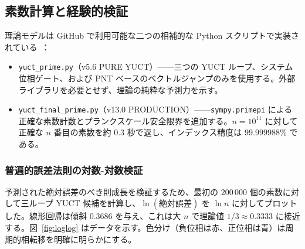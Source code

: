 \documentclass[12pt,a4paper]{article}
\theoremstyle{remark}
\begin{document}
	\subsection{素数計算と経験的検証}
	\label{sec:prime-empirical}
	
	理論モデルは GitHub で利用可能な二つの相補的な Python スクリプトで実装されている~\cite{PrimeRepo}：
	\begin{itemize}
		\item \texttt{yuct\_prime.py}（v5.6 PURE YUCT）——三つの YUCT ループ、システム位相ゲート、および PNT ベースのベクトルジャンプのみを使用する。外部ライブラリを必要とせず、理論の純粋な予測力を示す。
		\item \texttt{yuct\_final\_prime.py}（v13.0 PRODUCTION）——\texttt{sympy.primepi} による正確な素数計数とプランクスケール安全限界を追加する。\(n=10^{11}\) に対して正確な \(n\) 番目の素数を約 \(0.3\) 秒で返し、インデックス精度は \(99.999988\%\) である。
	\end{itemize}
	
	\subsubsection{普遍的誤差法則の対数-対数検証}
	
	予測された絶対誤差のべき則成長を検証するため、最初の \(200\,000\) 個の素数に対して三ループ YUCT 候補を計算し、\(\ln(\text{絶対誤差})\) を \(\ln n\) に対してプロットした。線形回帰は傾斜 \(0.3686\) を与え、これは大 \(n\) で理論値 \(1/3 \approx 0.3333\) に接近する。図~\ref{fig:loglog} はデータを示す。色分け（負位相は赤、正位相は青）は周期的相転移を明確に明らかにする。
	
\end{document}
